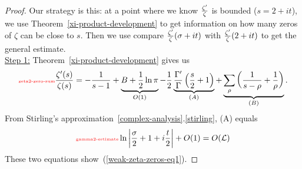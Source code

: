 \begin{proof}
Our strategy is this: at a point where we know $\frac{\zeta'}{\zeta}$ is bounded ($s=2+it$), we use Theorem~\ref{xi-product-development} to get information on how many zeros of $\zeta$ can be close to $s$. Then we use compare $\frac{\zeta'}{\zeta}(\sigma+it)$ with $\frac{\zeta'}{\zeta}(2+it)$ to get the general estimate.\\

\noindent\underline{Step 1:}
Theorem~\ref{xi-product-development} gives us
\begin{equation}\llabel{zeta2-zero-sum}
\frac{\zeta'(s)}{\zeta(s)}=-\rc{s-1}+
\underbrace{B+\rc2\ln\pi}_{O(1)}
-
\rc2\underbrace{\frac{\Ga'}{\Ga}\pa{%
\frac s2+1}}_{(A)}+
\underbrace{\sum_{\rh} \pa{\rc{%
s-\rh}+\rc{\rh}}}_{(B)}.
\end{equation}
From Stirling's approximation~\ref{complex-analysis}.\ref{stirling}, (A) equals
\begin{equation}\llabel{gamma2-estimate}
\ln\ab{\frac{\si}{2}+1+i\frac t2}%
+O(1)=
O(\cal L)
\end{equation}
These two equations show~(\ref{weak-zeta-zeros-eq1}).


\end{proof}
